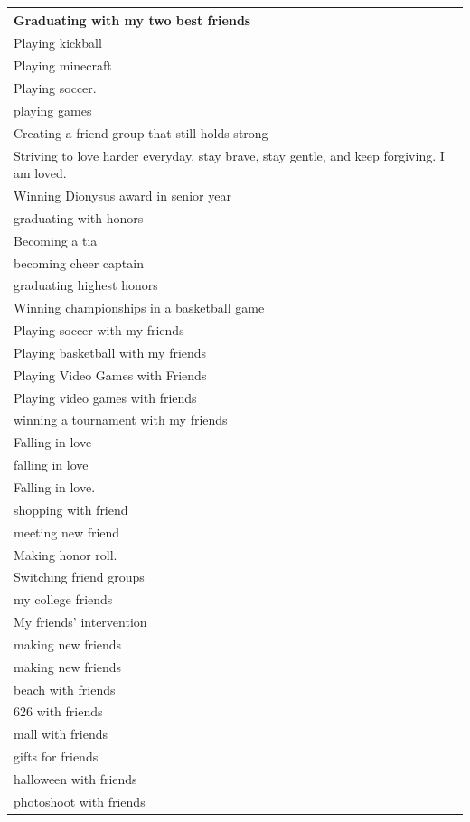 \documentclass[
  .7em,
  letterpaper,
  DIV=11,
  numbers=noendperiod]{scrartcl}
\begin{document}
\begin{table}
\begin{tabular}{l}
\hline
Graduating with my two best friends\\
\hline
Playing kickball\\
\hline
Playing minecraft\\
\hline
Playing soccer.\\
\hline
playing games\\
\hline
Creating a friend group that still holds strong\\
\hline
Striving to love harder everyday, stay brave, stay gentle, and keep forgiving. I am loved.\\
\hline
Winning Dionysus award in senior year\\
\hline
graduating with honors\\
\hline
Becoming a tia\\
\hline
becoming cheer captain\\
\hline
graduating highest honors\\
\hline
Winning championships in a basketball game\\
\hline
Playing soccer with my friends\\
\hline
Playing basketball with my friends\\
\hline
Playing Video Games with Friends\\
\hline
Playing video games with friends\\
\hline
winning a tournament with my friends\\
\hline
Falling in love\\
\hline
falling in love\\
\hline
Falling in love.\\
\hline
shopping with friend\\
\hline
meeting new friend\\
\hline
Making honor roll.\\
\hline
Switching friend groups\\
\hline
my college friends\\
\hline
My friends' intervention\\
\hline
making new friends\\
\hline
making new friends\\
\hline
beach with friends\\
\hline
626 with friends\\
\hline
mall with friends\\
\hline
gifts for friends\\
\hline
halloween with friends\\
\hline
photoshoot with friends\\

\end{tabular}
\end{table}
\end{document}

